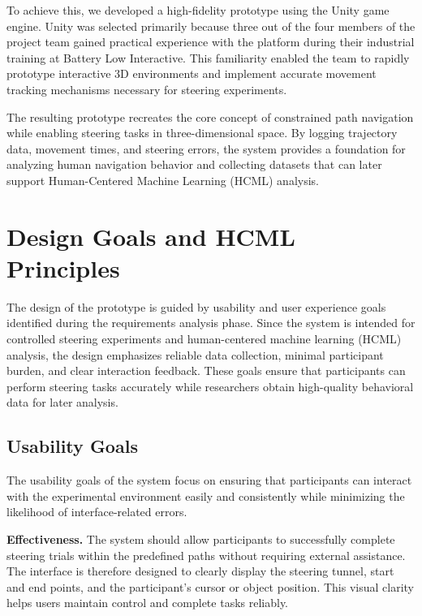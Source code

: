 \documentclass[sigconf]{acmart}
\begin{document}
To achieve this, we developed a high-fidelity prototype using the Unity game engine. Unity was selected primarily because three out of the four members of the project team gained practical experience with the platform during their industrial training at Battery Low Interactive. This familiarity enabled the team to rapidly prototype interactive 3D environments and implement accurate movement tracking mechanisms necessary for steering experiments.

The resulting prototype recreates the core concept of constrained path navigation while enabling steering tasks in three-dimensional space. By logging trajectory data, movement times, and steering errors, the system provides a foundation for analyzing human navigation behavior and collecting datasets that can later support Human-Centered Machine Learning (HCML) analysis.


\section{Design Goals and HCML Principles}

The design of the prototype is guided by usability and user experience goals identified during the requirements analysis phase. Since the system is intended for controlled steering experiments and human-centered machine learning (HCML) analysis, the design emphasizes reliable data collection, minimal participant burden, and clear interaction feedback. These goals ensure that participants can perform steering tasks accurately while researchers obtain high-quality behavioral data for later analysis.

\subsection{Usability Goals}

The usability goals of the system focus on ensuring that participants can interact with the experimental environment easily and consistently while minimizing the likelihood of interface-related errors.

\textbf{Effectiveness.} The system should allow participants to successfully complete steering trials within the predefined paths without requiring external assistance. The interface is therefore designed to clearly display the steering tunnel, start and end points, and the participant’s cursor or object position. This visual clarity helps users maintain control and complete tasks reliably.
\end{document}
